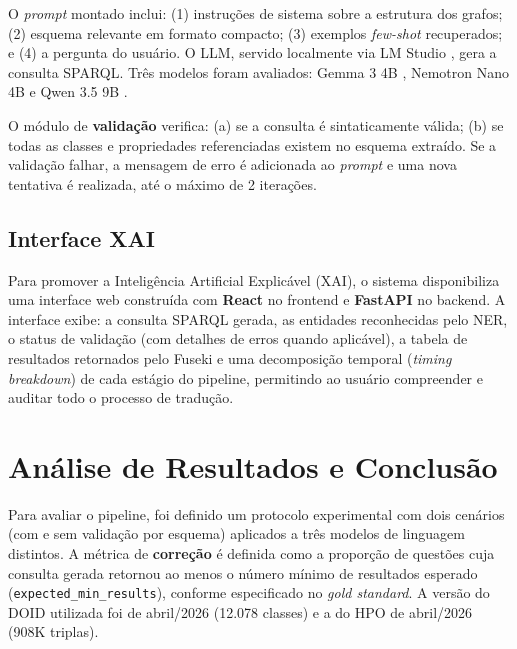 \documentclass[12pt]{article}
\begin{document}
O \textit{prompt} montado inclui: (1) instru\c{c}\~{o}es de sistema sobre a estrutura dos grafos; (2) esquema relevante em formato compacto; (3) exemplos \textit{few-shot} recuperados; e (4) a pergunta do usu\'{a}rio. O LLM, servido localmente via LM Studio \cite{lmstudio2024}, gera a consulta SPARQL. Tr\^{e}s modelos foram avaliados: Gemma 3 4B \cite{gemma2025}, Nemotron Nano 4B \cite{nemotron2024} e Qwen 3.5 9B \cite{qwen2025}.

O m\'{o}dulo de \textbf{valida\c{c}\~{a}o} verifica: (a) se a consulta \'{e} sintaticamente v\'{a}lida; (b) se todas as classes e propriedades referenciadas existem no esquema extra\'{i}do. Se a valida\c{c}\~{a}o falhar, a mensagem de erro \'{e} adicionada ao \textit{prompt} e uma nova tentativa \'{e} realizada, at\'{e} o m\'{a}ximo de 2 itera\c{c}\~{o}es.

\subsection{Interface XAI}
\label{sec:interface}

Para promover a Intelig\^{e}ncia Artificial Explic\'{a}vel (XAI), o sistema disponibiliza uma interface web constru\'{i}da com \textbf{React} no frontend e \textbf{FastAPI} no backend. A interface exibe: a consulta SPARQL gerada, as entidades reconhecidas pelo NER, o status de valida\c{c}\~{a}o (com detalhes de erros quando aplic\'{a}vel), a tabela de resultados retornados pelo Fuseki e uma decomposi\c{c}\~{a}o temporal (\textit{timing breakdown}) de cada est\'{a}gio do pipeline, permitindo ao usu\'{a}rio compreender e auditar todo o processo de tradu\c{c}\~{a}o.

\section{An\'{a}lise de Resultados e Conclus\~{a}o}
\label{sec:resultados}

Para avaliar o pipeline, foi definido um protocolo experimental com dois cen\'{a}rios (com e sem valida\c{c}\~{a}o por esquema) aplicados a tr\^{e}s modelos de linguagem distintos. A m\'{e}trica de \textbf{corre\c{c}\~{a}o} \'{e} definida como a propor\c{c}\~{a}o de quest\~{o}es cuja consulta gerada retornou ao menos o n\'{u}mero m\'{i}nimo de resultados esperado (\texttt{expected\_min\_results}), conforme especificado no \textit{gold standard}. A vers\~{a}o do DOID utilizada foi de abril/2026 (12.078 classes) e a do HPO de abril/2026 (908K triplas).
\end{document}
